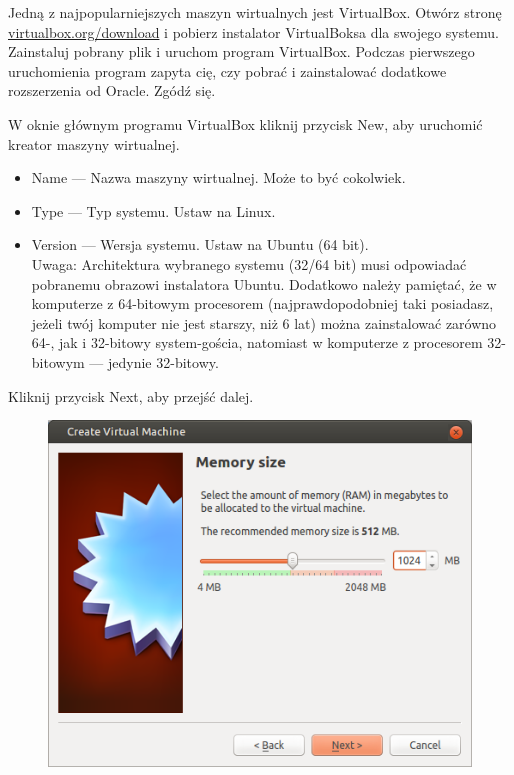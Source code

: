 Jedną z najpopularniejszych maszyn wirtualnych jest VirtualBox. Otwórz stronę \href{https://www.virtualbox.org/wiki/Downloads}{virtualbox.org/download} i pobierz instalator VirtualBoksa dla swojego systemu. Zainstaluj pobrany plik i uruchom program VirtualBox. Podczas pierwszego uruchomienia program zapyta cię, czy pobrać i zainstalować dodatkowe rozszerzenia od Oracle. Zgódź się.

W oknie głównym programu VirtualBox kliknij przycisk \textcolor{ubuntu_orange}{New}, aby uruchomić kreator maszyny wirtualnej.


\begin{itemize}
\item \textcolor{ubuntu_orange}{Name} --- Nazwa maszyny wirtualnej. Może to być cokolwiek.
\item \textcolor{ubuntu_orange}{Type} --- Typ systemu. Ustaw na \textcolor{ubuntu_orange}{Linux}.
\item \textcolor{ubuntu_orange}{Version} --- Wersja systemu. Ustaw na \textcolor{ubuntu_orange}{Ubuntu (64 bit)}.\\
Uwaga: Architektura wybranego systemu (32/64 bit) musi odpowiadać pobranemu obrazowi instalatora Ubuntu. Dodatkowo należy pamiętać, że w komputerze z 64-bitowym procesorem (najprawdopodobniej taki posiadasz, jeżeli twój komputer nie jest starszy, niż 6 lat) można zainstalować zarówno 64-, jak i 32-bitowy system-gościa, natomiast w komputerze z procesorem 32-bitowym --- jedynie 32-bitowy.
\end{itemize}
\begin{flushright}
Kliknij przycisk \textcolor{ubuntu_orange}{Next}, aby przejść dalej.
\end{flushright}

\clearpage
\begin{figure}
	\vspace{-10pt}
	\includegraphics[width=\linewidth]{images/virtualbox_wizard2.png}
\end{figure}

